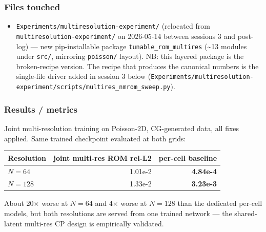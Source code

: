 \subsubsection*{Files touched}
\begin{itemize}
  \item \texttt{Experiments/multiresolution-experiment/} (relocated from
        \texttt{multiresolution-experiment/} on 2026-05-14 between sessions 3
        and post-log) --- new pip-installable package \texttt{tunable\_rom\_multires}
        (\textasciitilde{}13 modules under \texttt{src/}, mirroring
        \texttt{poisson/} layout). NB: this layered package is the broken-recipe
        version. The recipe that produces the canonical numbers is the
        single-file driver added in session 3 below
        (\texttt{Experiments/multiresolution-experiment/scripts/multires\_nmrom\_sweep.py}).
\end{itemize}

\subsubsection*{Results / metrics}
Joint multi-resolution training on Poisson-2D, CG-generated data, all fixes
applied. Same trained checkpoint evaluated at both grids:
\begin{center}
\begin{tabular}{l r r}
  \textbf{Resolution} & \textbf{joint multi-res ROM rel-L2} & \textbf{per-cell baseline} \\
  \hline
  $N{=}64$  & 1.01e-2 & \textbf{4.84e-4} \\
  $N{=}128$ & 1.33e-2 & \textbf{3.23e-3} \\
\end{tabular}
\end{center}
About 20$\times$ worse at $N{=}64$ and 4$\times$ worse at $N{=}128$ than the
dedicated per-cell models, but both resolutions are served from one trained
network --- the shared-latent multi-res CP design is empirically validated.

